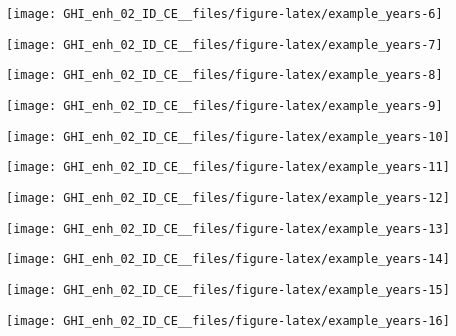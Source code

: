 \documentclass[
  10pt,
  a4paper,oneside]{article}
\begin{document}
\begin{center}\texttt{[image: GHI\_enh\_02\_ID\_CE\_\_files/figure-latex/example\_years-6]} \end{center}

\begin{center}\texttt{[image: GHI\_enh\_02\_ID\_CE\_\_files/figure-latex/example\_years-7]} \end{center}

\begin{center}\texttt{[image: GHI\_enh\_02\_ID\_CE\_\_files/figure-latex/example\_years-8]} \end{center}

\begin{center}\texttt{[image: GHI\_enh\_02\_ID\_CE\_\_files/figure-latex/example\_years-9]} \end{center}

\begin{center}\texttt{[image: GHI\_enh\_02\_ID\_CE\_\_files/figure-latex/example\_years-10]} \end{center}

\begin{center}\texttt{[image: GHI\_enh\_02\_ID\_CE\_\_files/figure-latex/example\_years-11]} \end{center}

\begin{center}\texttt{[image: GHI\_enh\_02\_ID\_CE\_\_files/figure-latex/example\_years-12]} \end{center}

\begin{center}\texttt{[image: GHI\_enh\_02\_ID\_CE\_\_files/figure-latex/example\_years-13]} \end{center}

\begin{center}\texttt{[image: GHI\_enh\_02\_ID\_CE\_\_files/figure-latex/example\_years-14]} \end{center}

\begin{center}\texttt{[image: GHI\_enh\_02\_ID\_CE\_\_files/figure-latex/example\_years-15]} \end{center}

\begin{center}\texttt{[image: GHI\_enh\_02\_ID\_CE\_\_files/figure-latex/example\_years-16]} \end{center}
\end{document}
